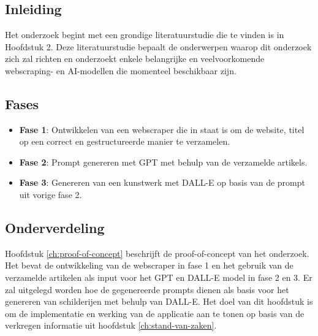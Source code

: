 
\chapter{}%
\label{ch:methodologie}

\section{Inleiding}
Het onderzoek begint met een grondige literatuurstudie die te vinden is in Hoofdstuk 2. Deze literatuurstudie bepaalt de onderwerpen waarop dit onderzoek zich zal richten en onderzoekt enkele belangrijke en veelvoorkomende webscraping- en AI-modellen die momenteel beschikbaar zijn.  \\

\section{Fases}
\begin{itemize}
    \item \textbf{Fase 1}: Ontwikkelen van een webscraper die in staat is om de website, titel op een correct en gestructureerde manier te verzamelen. 
    \item \textbf{Fase 2}: Prompt genereren met GPT met behulp van de verzamelde artikels. 
    \item \textbf{Fase 3}: Genereren van een kunstwerk met DALL-E op basis van de prompt uit vorige fase 2.
\end{itemize} 

\section{Onderverdeling}

Hoofdstuk \ref{ch:proof-of-concept}  beschrijft de proof-of-concept van het onderzoek. Het bevat de ontwikkeling van de webscraper in fase 1 en het gebruik van de verzamelde artikelen als input voor het GPT en DALL-E model in fase 2 en 3. Er zal uitgelegd worden hoe de gegenereerde prompts dienen als basis voor het genereren van schilderijen met behulp van DALL-E. Het doel van dit hoofdstuk is om de implementatie en werking van de applicatie aan te tonen op basis van de verkregen informatie uit hoofdstuk \ref{ch:stand-van-zaken}.  \\

